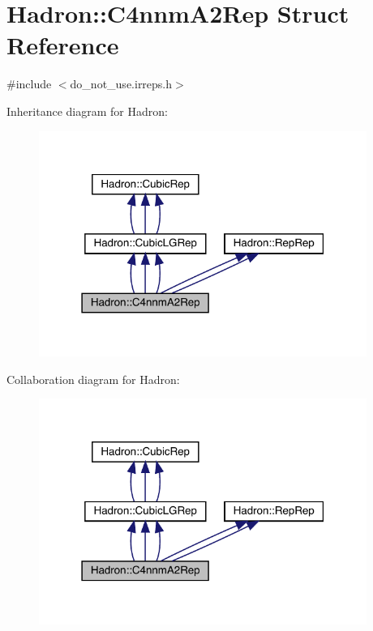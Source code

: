 \hypertarget{structHadron_1_1C4nnmA2Rep}{}\section{Hadron\+:\+:C4nnm\+A2\+Rep Struct Reference}
\label{structHadron_1_1C4nnmA2Rep}


{\ttfamily \#include $<$do\+\_\+not\+\_\+use.\+irreps.\+h$>$}



Inheritance diagram for Hadron\+:
\nopagebreak
\begin{figure}[H]
\begin{center}
\leavevmode
\includegraphics[width=303pt]{d2/d33/structHadron_1_1C4nnmA2Rep__inherit__graph}
\end{center}
\end{figure}


Collaboration diagram for Hadron\+:
\nopagebreak
\begin{figure}[H]
\begin{center}
\leavevmode
\includegraphics[width=303pt]{da/d77/structHadron_1_1C4nnmA2Rep__coll__graph}
\end{center}
\end{figure}
